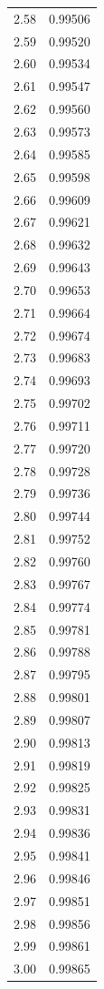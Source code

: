\documentclass[
  letterpaper,
  DIV=11,
  numbers=noendperiod]{scrartcl}
\begin{document}
\begin{longtable}[]{@{}cc@{}}
2.58 & 0.99506 \\
2.59 & 0.99520 \\
2.60 & 0.99534 \\
2.61 & 0.99547 \\
2.62 & 0.99560 \\
2.63 & 0.99573 \\
2.64 & 0.99585 \\
2.65 & 0.99598 \\
2.66 & 0.99609 \\
2.67 & 0.99621 \\
2.68 & 0.99632 \\
2.69 & 0.99643 \\
2.70 & 0.99653 \\
2.71 & 0.99664 \\
2.72 & 0.99674 \\
2.73 & 0.99683 \\
2.74 & 0.99693 \\
2.75 & 0.99702 \\
2.76 & 0.99711 \\
2.77 & 0.99720 \\
2.78 & 0.99728 \\
2.79 & 0.99736 \\
2.80 & 0.99744 \\
2.81 & 0.99752 \\
2.82 & 0.99760 \\
2.83 & 0.99767 \\
2.84 & 0.99774 \\
2.85 & 0.99781 \\
2.86 & 0.99788 \\
2.87 & 0.99795 \\
2.88 & 0.99801 \\
2.89 & 0.99807 \\
2.90 & 0.99813 \\
2.91 & 0.99819 \\
2.92 & 0.99825 \\
2.93 & 0.99831 \\
2.94 & 0.99836 \\
2.95 & 0.99841 \\
2.96 & 0.99846 \\
2.97 & 0.99851 \\
2.98 & 0.99856 \\
2.99 & 0.99861 \\
3.00 & 0.99865 \\
\end{longtable}
\end{document}
